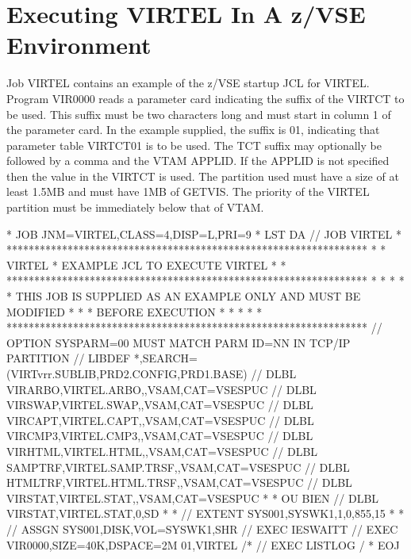 \documentclass[letterpaper,10pt,english]{sphinxmanual}
\begin{document}
\section{Executing VIRTEL In A z/VSE Environment}
\label{\detokenize{Installation_Guide:executing-virtel-in-a-z-vse-environment}}
Job VIRTEL contains an example of the z/VSE startup JCL for VIRTEL. Program VIR0000 reads a parameter card indicating the suffix of the VIRTCT to be used. This suffix must be two characters long and must start in column 1 of the parameter card. In the example supplied, the suffix is 01, indicating that parameter table VIRTCT01 is to be used. The TCT suffix may optionally be followed by a comma and the VTAM APPLID. If the APPLID is not specified then the value in the VIRTCT is used. The partition used must have a size of at least 1.5MB and must have 1MB of GETVIS. The priority of the VIRTEL partition must be immediately below that of VTAM.

\begin{sphinxVerbatim}[commandchars=\\\{\}]
* \PYGZdl{}\PYGZdl{} JOB JNM=VIRTEL,CLASS=4,DISP=L,PRI=9
* \PYGZdl{}\PYGZdl{} LST DA
// JOB VIRTEL
* *****************************************************************
* * VIRTEL * EXAMPLE JCL TO EXECUTE VIRTEL *
* *****************************************************************
* * *
* * THIS JOB IS SUPPLIED AS AN EXAMPLE ONLY AND MUST BE MODIFIED *
* * BEFORE EXECUTION *
* * *
* *****************************************************************
// OPTION SYSPARM=\PYGZsq{}00\PYGZsq{} MUST MATCH PARM ID=NN IN TCP/IP PARTITION
// LIBDEF *,SEARCH=(VIRTvrr.SUBLIB,PRD2.CONFIG,PRD1.BASE)
// DLBL VIRARBO,\PYGZsq{}VIRTEL.ARBO\PYGZsq{},,VSAM,CAT=VSESPUC
// DLBL VIRSWAP,\PYGZsq{}VIRTEL.SWAP\PYGZsq{},,VSAM,CAT=VSESPUC
// DLBL VIRCAPT,\PYGZsq{}VIRTEL.CAPT\PYGZsq{},,VSAM,CAT=VSESPUC
// DLBL VIRCMP3,\PYGZsq{}VIRTEL.CMP3\PYGZsq{},,VSAM,CAT=VSESPUC
// DLBL VIRHTML,\PYGZsq{}VIRTEL.HTML\PYGZsq{},,VSAM,CAT=VSESPUC
// DLBL SAMPTRF,\PYGZsq{}VIRTEL.SAMP.TRSF\PYGZsq{},,VSAM,CAT=VSESPUC
// DLBL HTMLTRF,\PYGZsq{}VIRTEL.HTML.TRSF\PYGZsq{},,VSAM,CAT=VSESPUC
// DLBL VIRSTAT,\PYGZsq{}VIRTEL.STAT\PYGZsq{},,VSAM,CAT=VSESPUC
* * OU BIEN // DLBL VIRSTAT,\PYGZsq{}VIRTEL.STAT\PYGZsq{},0,SD
* * // EXTENT SYS001,SYSWK1,1,0,855,15
* * // ASSGN SYS001,DISK,VOL=SYSWK1,SHR
// EXEC IESWAITT
// EXEC VIR0000,SIZE=40K,DSPACE=2M
01,VIRTEL
/*
// EXEC LISTLOG
/\PYGZam{}
* \PYGZdl{}\PYGZdl{} EOJ
\end{sphinxVerbatim}

\end{document}
